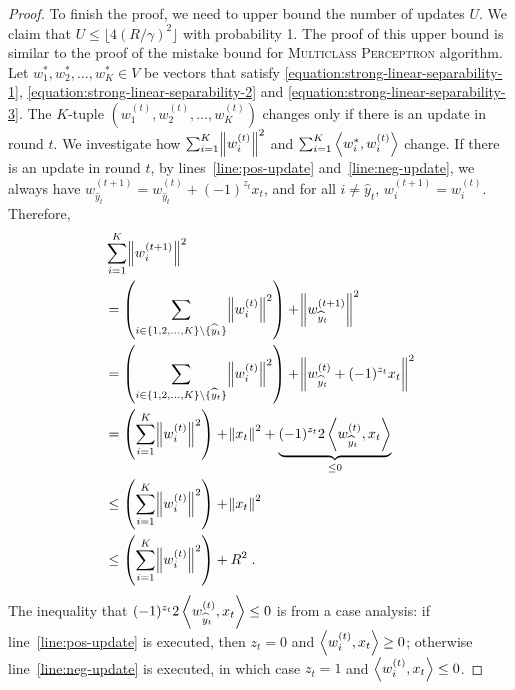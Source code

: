 \begin{proof}
To finish the proof, we need to upper bound the number of updates $U$. We claim
that $U \le \lfloor 4(R/\gamma)^2 \rfloor$ with probability 1.
The proof of this upper bound is
similar to the proof of the mistake bound for \textsc{Multiclass Perceptron}
algorithm. Let $w_1^*, w_2^*, \dots, w_K^* \in V$ be vectors that satisfy
\eqref{equation:strong-linear-separability-1},
\eqref{equation:strong-linear-separability-2} and
\eqref{equation:strong-linear-separability-3}.
The $K$-tuple $(w_1^{(t)}, w_2^{(t)}, \dots, w_K^{(t)})$
changes only if there is an update in round $t$.
We investigate how $\sum_{i=1}^K \norm{w_i^{(t)}}^2$ and
$\sum_{i=1}^K \left\langle w_i^*, w_i^{(t)} \right\rangle$ change. If there is an update in round $t$,
by lines~\ref{line:pos-update} and~\ref{line:neg-update}, we always have
$ w_{\widehat y_t}^{(t+1)} = w_{\widehat y_t}^{(t)} + (-1)^{z_t} x_t $,
and for all $i \neq \widehat y_t$, $w_{i}^{(t+1)} = w_{i}^{(t)}$.
Therefore,
\begingroup
\allowdisplaybreaks
\begin{align*}
& \sum_{i=1}^K \norm{w_i^{(t+1)}}^2 \\
& = \left( \sum_{i \in \{1,2,\dots,K\} \setminus \{\widehat y_t\}} \norm{w_i^{(t)}}^2 \right) + \norm{w_{\widehat y_t}^{(t+1)}}^2 \\
& = \left( \sum_{i \in \{1,2,\dots,K\} \setminus \{\widehat y_t\}} \norm{w_i^{(t)}}^2 \right) + \norm{w_{\widehat y_t}^{(t)} + (-1)^{z_t} x_t}^2 \\
& = \left( \sum_{i=1}^K \norm{w_i^{(t)}}^2 \right) + \norm{x_t}^2 + \underbrace{(-1)^{z_t} 2 \left\langle w_{\widehat y_t}^{(t)}, x_t \right\rangle}_{\le 0} \\
& \le \left( \sum_{i=1}^K \norm{w_i^{(t)}}^2 \right) + \norm{x_t}^2 \\
& \le \left( \sum_{i=1}^K \norm{w_i^{(t)}}^2 \right) + R^2 \; .
\end{align*}
\endgroup
The inequality that $(-1)^{z_t} 2 \left\langle w_{\widehat y_t}^{(t)}, x_t \right\rangle \leq 0$ is from a case analysis: if line~\ref{line:pos-update} is executed, then $z_t = 0$ and $\left\langle w_i^{(t)}, x_t \right\rangle \ge 0$; otherwise line~\ref{line:neg-update} is executed, in which case $z_t = 1$ and $\left\langle w_i^{(t)}, x_t \right\rangle \le 0$.



\end{proof}
